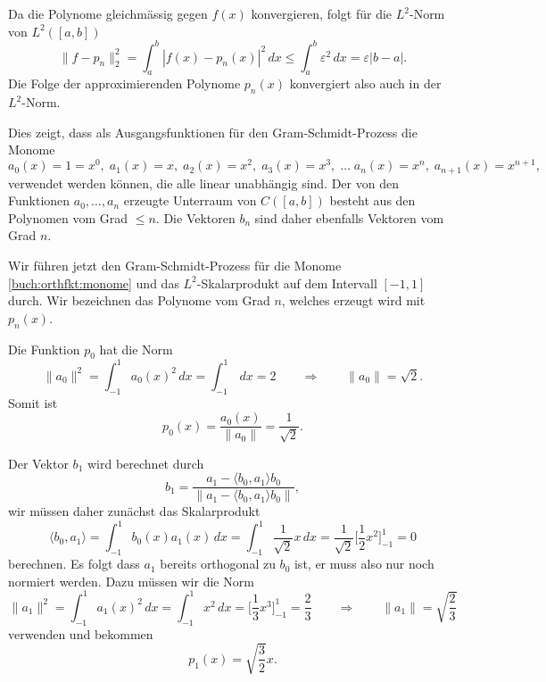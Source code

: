 Da die Polynome gleichmässig gegen $f(x)$ konvergieren, folgt für die
$L^2$-Norm von $L^2([a,b])$
\[
\| f-p_n \|_2^2
=
\int_a^b |f(x)-p_n(x)|^2\,dx
\le 
\int_a^b \varepsilon^2 \,dx
=
\varepsilon |b-a|.
\]
Die Folge der approximierenden Polynome $p_n(x)$ konvergiert also
auch in der $L^2$-Norm.

Dies zeigt, dass als Ausgangsfunktionen für den Gram-Schmidt-Prozess
die Monome
\begin{equation}
a_0(x)=1=x^0,\;
a_1(x)=x,\;
a_2(x)=x^2,\;
a_3(x)=x^3,\;
\ldots\;
a_n(x)=x^n,\;
a_{n+1}(x)=x^{n+1},\;
\label{buch:orthfkt:monome}
\end{equation}
verwendet werden können, die alle linear unabhängig sind.
Der von den Funktionen $a_0,\dots,a_n$ erzeugte Unterraum von
$C([a,b])$ besteht aus den Polynomen vom Grad $\le n$.
Die Vektoren $b_n$ sind daher ebenfalls Vektoren vom Grad $n$.

Wir führen jetzt den Gram-Schmidt-Prozess für die Monome
\eqref{buch:orthfkt:monome}
und das $L^2$-Skalarprodukt auf dem Intervall $[-1,1]$ durch.
Wir bezeichnen das Polynome vom Grad $n$, welches erzeugt wird mit $p_n(x)$.

Die Funktion $p_0$ hat die Norm
\[
\|a_0\|^2
=
\int_{-1}^1 a_0(x)^2\,dx
=
\int_{-1}^1 \,dx
=
2
\qquad\Rightarrow\qquad
\|a_0\| = \!\sqrt{2}.
\]
Somit ist
\[
p_0(x) = \frac{a_0(x)}{\|a_0\|} = \frac{1}{\!\sqrt{2}}.
\]

Der Vektor $b_1$ wird berechnet durch
\[
b_1
=
\frac{
a_1-\langle b_0,a_1\rangle b_0
}{
\|
a_1-\langle b_0,a_1\rangle b_0
\|
},
\]
wir müssen daher zunächst das Skalarprodukt
\[
\langle b_0,a_1\rangle
=
\int_{-1}^1 b_0(x)a_1(x)\,dx
=
\int_{-1}^1 \frac{1}{\!\sqrt{2}} x\,dx
=
\frac{1}{\!\sqrt{2}} \biggl[\frac12x^2\biggr]_{-1}^1=0
\]
berechnen.
Es folgt dass $a_1$ bereits orthogonal zu $b_0$ ist, er muss also
nur noch normiert werden.
Dazu müssen wir die Norm
\[
\| a_1\|^2
=
\int_{-1}^1 a_1(x)^2\,dx
=
\int_{-1}^1 x^2\,dx
=
\biggl[\frac13x^3\biggr]_{-1}^1
=
\frac{2}{3}
\qquad\Rightarrow\qquad
\|a_1\|
=
\!\sqrt{\frac{2}{3}}
\]
verwenden und bekommen
\[
p_1(x) = \!\sqrt{\frac{3}{2}} x.
\]


